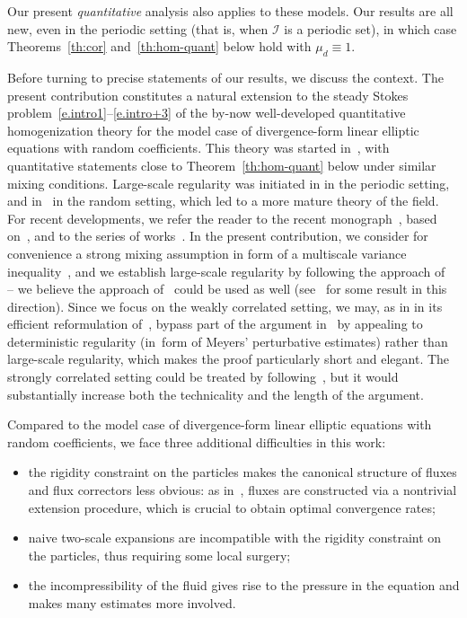 \documentclass[JEP,XML,SOM,Unicode,published]{cedram}
\let\mathcal\mathscr
\newcounter{assumption}
\theoremstyle{plain}
\theoremstyle{definition}
\newcommand{\Ic}{\mathcal I}
\begin{document}
Our present \emph{quantitative} analysis also applies to these models.
Our results are all new, even in the periodic setting (that is, when $\Ic$ is a periodic set), in which case Theorems~\ref{th:cor} and~\ref{th:hom-quant} below hold with $\mu_d\equiv 1$.

Before turning to precise statements of our results, we discuss the context.
The present contribution constitutes a natural extension
to the steady Stokes problem~\eqref{e.intro1}--\eqref{e.intro+3}
of the by-now well-developed quantitative homogenization
theory for the model case of divergence-form linear elliptic equations with random coefficients. This theory was started in~\cite{GO1,GO2,GNO1,GNO2,Gloria-Otto-10b,MaO}, with quantitative statements close to Theorem~\ref{th:hom-quant} below under
similar mixing conditions. Large-scale regularity was initiated in \cite{Avellaneda-Lin-87,Avellaneda-Lin-91} in the periodic setting, and in~\cite{AS} in the random setting, which led to a more mature theory of the field.
For recent developments, we refer the reader to the recent monograph~\cite{AKM-book}, based on~\cite{AM-16,AKM1,AKM2}, and to the series of works~\cite{GNO-reg,GNO-quant,GO4,DO1,JO}.
In the present contribution,
we consider for convenience a strong mixing assumption in form of a multiscale variance inequality~\cite{DG1,DG2},
and we establish large-scale regularity by following the approach of~\cite{GNO-reg,GNO-quant,DO1} -- we believe the approach of~\cite{AKM-book} could be used as well (see~\cite[App.\,B]{DG-20c} for some result in this direction).
Since we focus on the weakly correlated setting, we may, as in \cite{GO1} in its efficient reformulation of~\cite{JO}, bypass part of the argument in~\cite{GNO-reg,GNO-quant} by appealing to deterministic regularity (in~form of Meyers' perturbative estimates) rather than large-scale regularity, which makes the proof particularly short and elegant.
The strongly correlated setting could be treated by following~\cite{GNO-reg}, but it would substantially increase both the technicality and the length of the argument.

Compared to the model case of divergence-form linear elliptic equations with random coefficients, we face three additional difficulties in this work:
\begin{itemize}
\item
the rigidity constraint on the particles makes the canonical structure of fluxes and flux correctors less obvious: as in~\cite{D-20}, fluxes are constructed via a nontrivial extension procedure, which is crucial to obtain optimal convergence rates;
\item
naive two-scale expansions are incompatible with the rigidity constraint on the particles, thus requiring some local surgery;
\item
the incompressibility of the fluid gives rise to the pressure in the equation and makes many estimates more involved.
\end{itemize}
\end{document}
